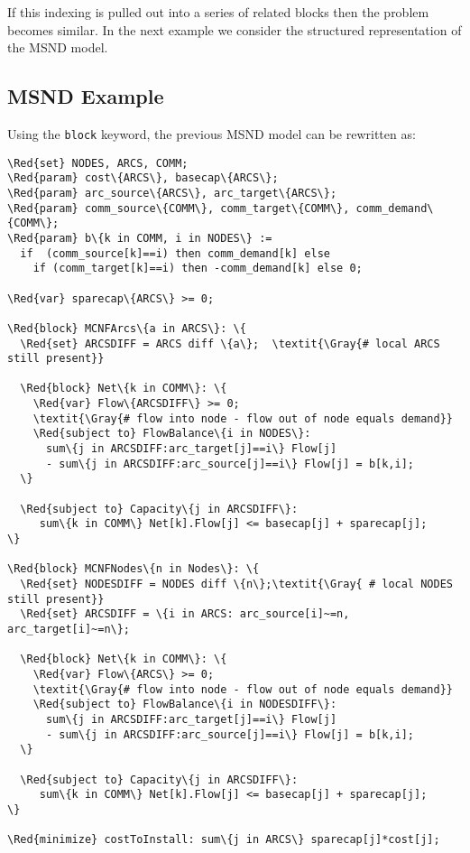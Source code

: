 \documentclass[10pt,a4paper]{report}
\begin{document}
If this indexing is pulled out into a series of related blocks then the
problem becomes similar. In the next example we consider the structured
representation of the MSND model.

\subsection{MSND Example}
Using the {\tt block} keyword, the previous MSND model can be rewritten as:

\begin{Verbatim}[frame=single,framerule=0.2pt,framesep=5pt,commandchars=\\\{\}]
\Red{set} NODES, ARCS, COMM;
\Red{param} cost\{ARCS\}, basecap\{ARCS\};
\Red{param} arc_source\{ARCS\}, arc_target\{ARCS\};
\Red{param} comm_source\{COMM\}, comm_target\{COMM\}, comm_demand\{COMM\};
\Red{param} b\{k in COMM, i in NODES\} := 
  if  (comm_source[k]==i) then comm_demand[k] else 
    if (comm_target[k]==i) then -comm_demand[k] else 0;

\Red{var} sparecap\{ARCS\} >= 0;

\Red{block} MCNFArcs\{a in ARCS\}: \{
  \Red{set} ARCSDIFF = ARCS diff \{a\};  \textit{\Gray{# local ARCS still present}}

  \Red{block} Net\{k in COMM\}: \{
    \Red{var} Flow\{ARCSDIFF\} >= 0;
    \textit{\Gray{# flow into node - flow out of node equals demand}} 
    \Red{subject to} FlowBalance\{i in NODES\}:
      sum\{j in ARCSDIFF:arc_target[j]==i\} Flow[j]  
      - sum\{j in ARCSDIFF:arc_source[j]==i\} Flow[j] = b[k,i];  
  \}

  \Red{subject to} Capacity\{j in ARCSDIFF\}:
     sum\{k in COMM\} Net[k].Flow[j] <= basecap[j] + sparecap[j];
\}

\Red{block} MCNFNodes\{n in Nodes\}: \{
  \Red{set} NODESDIFF = NODES diff \{n\};\textit{\Gray{ # local NODES still present}}
  \Red{set} ARCSDIFF = \{i in ARCS: arc_source[i]~=n, arc_target[i]~=n\};

  \Red{block} Net\{k in COMM\}: \{
    \Red{var} Flow\{ARCS\} >= 0;
    \textit{\Gray{# flow into node - flow out of node equals demand}} 
    \Red{subject to} FlowBalance\{i in NODESDIFF\}:
      sum\{j in ARCSDIFF:arc_target[j]==i\} Flow[j]  
      - sum\{j in ARCSDIFF:arc_source[j]==i\} Flow[j] = b[k,i];  
  \}

  \Red{subject to} Capacity\{j in ARCSDIFF\}:
     sum\{k in COMM\} Net[k].Flow[j] <= basecap[j] + sparecap[j];
\}

\Red{minimize} costToInstall: sum\{j in ARCS\} sparecap[j]*cost[j];
\end{Verbatim}
\end{document}
